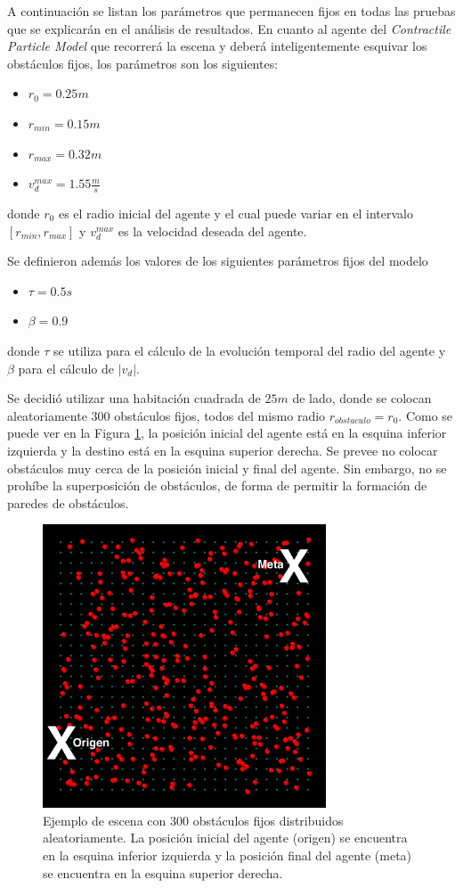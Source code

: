 \documentclass[a4paper,10pt]{article}
\begin{document}
A continuación se listan los parámetros que permanecen fijos en todas las pruebas que se explicarán en el análisis de resultados.
En cuanto al agente del \textit{Contractile Particle Model} que recorrerá la escena y deberá inteligentemente esquivar los obstáculos fijos, los parámetros son los siguientes:
\begin{itemize}
	\item $r_{0} = 0.25m$
	\item $r_{min} = 0.15m$
	\item $r_{max} = 0.32m$
	\item $v_{d}^{max} = 1.55 \frac{m}{s}$
\end{itemize}
donde $r_{0}$ es el radio inicial del agente y el cual puede variar en el intervalo $[ r_{min} , r_{max} ]$ y $v_{d}^{max}$ es la velocidad deseada del agente.

Se definieron además los valores de los siguientes parámetros fijos del modelo
\begin{itemize}
		\item $\tau = 0.5s$
		\item $\beta = 0.9$
\end{itemize}
donde $\tau$ se utiliza para el cálculo de la evolución temporal del radio del agente y $\beta$ para el cálculo de $|v_{d}|$. 

Se decidió utilizar una habitación cuadrada de $25m$ de lado, donde se colocan aleatoriamente 300 obstáculos fijos, todos del mismo radio $r_{obstaculo} = r_{0}$. Como se puede ver en la Figura \ref{fig:scene}, la posición inicial del agente está en la esquina inferior izquierda y la destino está en la esquina superior derecha. Se prevee no colocar obstáculos muy cerca de la posición inicial y final del agente. Sin embargo, no se prohíbe la superposición de obstáculos, de forma de permitir la formación de paredes de obstáculos.

\begin{figure}[H]
	\centering
    \includegraphics[width=0.75\textwidth]{images/scene.png}
    \caption{Ejemplo de escena con 300 obstáculos fijos distribuidos aleatoriamente. La posición inicial del agente (origen) se encuentra en la esquina inferior izquierda y la posición final del agente (meta) se encuentra en la esquina superior derecha.}
    \label{fig:scene}
\end{figure}
\end{document}
